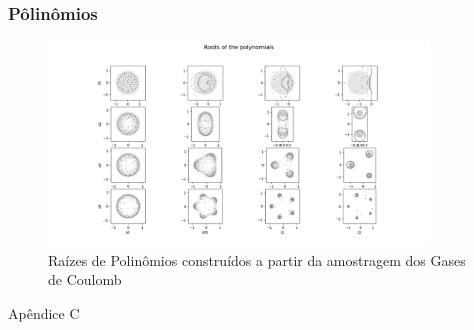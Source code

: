\begin{frame}
	\frametitle{Pôlinômios}
		\begin{figure}
			\centering
			\includegraphics[width=0.9\textwidth]{./media/Results/roots}	
			\caption{Raízes de Polinômios construídos a partir da amostragem dos Gases de Coulomb}
		\end{figure}
\end{frame}

{
	\begin{frame}
		\begin{center}
			\huge{Apêndice C}
		\end{center}
	\end{frame}
}


